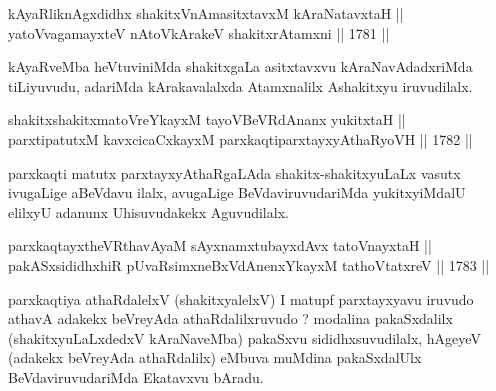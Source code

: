 
\begin{shl}
kAyaRliknAgxdidhx shakitxVnAmasitxtavxM kAraNatavxtaH || \\
yatoV\s vagamayxteV nAtoV\s kArakeV shakitxrAtamxni ||  1781 ||  
\end{shl}

\begin{artha}
kAyaRveMba heVtuviniMda shakitxgaLa asitxtavxvu kAraNavAdadxriMda
tiLiyuvudu, adariMda kArakavalalxda Atamxnalilx Ashakitxyu iruvudilalx.
\end{artha}


\begin{shl}
shakitxshakitxmatoVreYkayxM tayoVBeVRdAnanx yukitxtaH || \\
parxtipatutxM kavxcicaCxkayxM \footnotemark[1]parxkaqtiparxtayxyAthaRyoVH ||  1782 ||  
\end{shl}

\begin{artha}
parxkaqti matutx parxtayxyAthaRgaLAda
shakitx-shakitxyuLaLx vasutx ivugaLige aBeVdavu ilalx, avugaLige
BeVdaviruvudariMda yukitxyiMdalU elilxyU adanunx Uhisuvudakekx
Aguvudilalx.
\end{artha}


\begin{shl}
parxkaqtayxtheVR\s thavA\s yaM sAyxnamxtubayxdAvx tatoV\s nayxtaH ||  \\
pakASxsididhxhiR pUvaRsimxneBxVdAnenxYkayxM tathoVtatxreV ||  1783 ||  
\end{shl}

\begin{artha}
parxkaqtiya athaRdalelxV (shakitxyalelxV) I matupf parxtayxyavu iruvudo
athavA adakekx beVreyAda athaRdalilxruvudo ? modalina pakaSxdalilx
(shakitxyuLaLxdedxV kAraNaveMba) pakaSxvu sididhxsuvudilalx, hAgeyeV
(adakekx beVreyAda athaRdalilx) eMbuva muMdina pakaSxdalUlx
BeVdaviruvudariMda Ekatavxvu bAradu.
\end{artha}

